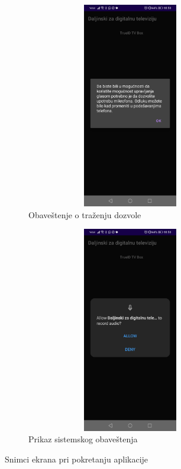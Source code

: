 \documentclass[implementacija.tex]{subfiles}
\begin{document}
\begin{figure}
    \centering
    \begin{subfigure}[b]{0.4\textwidth}
        \centering
        \includegraphics[width=10cm, height=9cm,keepaspectratio]{Implementacija/snimci_ekrana/1_obavestenje_za_dozvolu.jpg}
        \caption{Obaveštenje o traženju dozvole}
        \label{fig:dozvola}
    \end{subfigure}
    \hfill
    \begin{subfigure}[b]{0.4\textwidth}
        \centering
        \includegraphics[width=10cm, height=9cm, keepaspectratio]{Implementacija/snimci_ekrana/2_sistemska_dozvola.jpg}
        \caption{Prikaz sistemskog obaveštenja}
        \label{fig:sistemsko_obavestenje}
    \end{subfigure}
    \caption{Snimci ekrana pri pokretanju aplikacije}
    \label{fig:obavestenja}
\end{figure}
\end{document}
